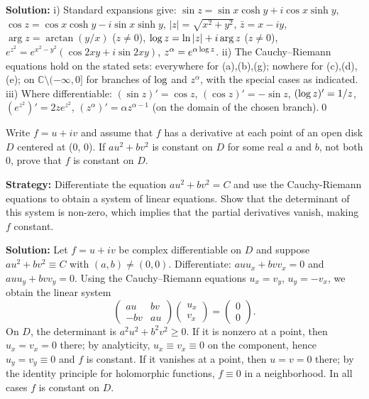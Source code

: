 \bigskip\noindent\textbf{Solution:}
i) Standard expansions give: $\sin z=\sin x\cosh y+i\cos x\sinh y$, $\cos z=\cos x\cosh y-i\sin x\sinh y$, $|z|=\sqrt{x^2+y^2}$, $\bar z=x-iy$, $\arg z=\arctan(y/x)$ ($z\ne 0$), $\log z=\ln|z|+i\arg z$ ($z\ne 0$), $e^{z^2}=e^{x^2-y^2}(\cos 2xy+i\sin 2xy)$, $z^{\alpha}=e^{\alpha\log z}$.\newline
ii) The Cauchy–Riemann equations hold on the stated sets: everywhere for (a),(b),(g); nowhere for (c),(d),(e); on $\mathbb{C}\setminus(-\infty,0]$ for branches of $\log$ and $z^{\alpha}$, with the special cases as indicated.\newline
iii) Where differentiable: $(\sin z)'=\cos z$, $(\cos z)'=-\sin z$, $(\log z)'=1/z$, $(e^{z^2})'=2z e^{z^2}$, $(z^{\alpha})'=\alpha z^{\alpha-1}$ (on the domain of the chosen branch).\qed


\begin{problembox}
\begin{problemstatement}
Write \( f = u + iv \) and assume that \( f \) has a derivative at each point of an open disk \( D \) centered at (0, 0). If \( au^2 + bv^2 \) is constant on \( D \) for some real \( a \) and \( b \), not both 0, prove that \( f \) is constant on \( D \).
\end{problemstatement}
\end{problembox}

\noindent\textbf{Strategy:} Differentiate the equation \( au^2 + bv^2 = C \) and use the Cauchy-Riemann equations to obtain a system of linear equations. Show that the determinant of this system is non-zero, which implies that the partial derivatives vanish, making \( f \) constant.

\bigskip\noindent\textbf{Solution:}
Let $f=u+iv$ be complex differentiable on $D$ and suppose $au^2+bv^2\equiv C$ with $(a,b)\ne (0,0)$. Differentiate: $auu_x+bvv_x=0$ and $auu_y+bvv_y=0$. Using the Cauchy–Riemann equations $u_x=v_y$, $u_y=-v_x$, we obtain the linear system
\[\begin{pmatrix}au&bv\\ -bv&au\end{pmatrix}\begin{pmatrix}u_x\\ v_x\end{pmatrix}=\begin{pmatrix}0\\ 0\end{pmatrix}.\]
On $D$, the determinant is $a^2u^2+b^2v^2\ge 0$. If it is nonzero at a point, then $u_x=v_x=0$ there; by analyticity, $u_x\equiv v_x\equiv 0$ on the component, hence $u_y=v_y\equiv 0$ and $f$ is constant. If it vanishes at a point, then $u=v=0$ there; by the identity principle for holomorphic functions, $f\equiv 0$ in a neighborhood. In all cases $f$ is constant on $D$.

